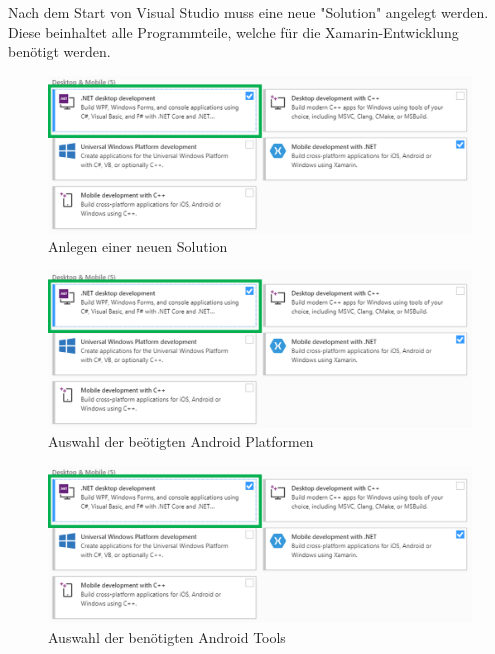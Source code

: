 Nach dem Start von Visual Studio muss eine neue "Solution" angelegt werden. Diese beinhaltet alle Programmteile, welche für die Xamarin-Entwicklung benötigt werden. 

\begin{figure}[H]
    \centering\includegraphics[width=0.7\linewidth]{images/auswahl_rahmenwerk/installation2.png}    
    \caption{Anlegen einer neuen Solution}
\end{figure}

\begin{figure}[H]
    \centering\includegraphics[width=0.7\linewidth]{images/auswahl_rahmenwerk/installation2.png}    
    \caption{Auswahl der beötigten Android Platformen}
\end{figure}
\begin{figure}[H]
    \centering\includegraphics[width=0.7\linewidth]{images/auswahl_rahmenwerk/installation2.png}    
    \caption{Auswahl der benötigten Android Tools}
\end{figure}





